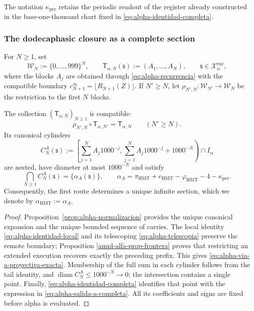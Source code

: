 The notation \(\kappa_{\mathrm{per}}\) retains the periodic readout of the register already constructed in the base-one-thousand chart fixed in \eqref{eq:alpha-identidad-completa}.

\subsubsection{The dodecaphasic closure as a complete section}

For \(N\geq1\), set
\[
 \mathcal W_N:=\{0,\ldots,999\}^{N},
 \qquad
 \mathsf T_{\alpha,N}(\mathsf s):=(A_1,\ldots,A_N),
 \qquad \mathsf s\in\mathcal X_{\alpha}^{\mathrm{enr}},
\]
where the blocks \(A_j\) are obtained through
\eqref{eq:alpha-recurrencia} with the compatible boundary
\(c_{N+1}^{\infty}=\lfloor R_{N+1}(Z)\rfloor\). If \(N'\geq N\), let
\(\rho_{N',N}:\mathcal W_{N'}\to\mathcal W_N\) be the restriction to the
first \(N\) blocks.

\begin{theorem}
\label{thm:alpha-salida-dodecafasica-completa}
The collection \((\mathsf T_{\alpha,N})_{N\geq1}\) is compatible:
\begin{equation}
 \rho_{N',N}\circ\mathsf T_{\alpha,N'}
 =\mathsf T_{\alpha,N}
 \qquad(N'\geq N).
 \label{eq:alpha-via-a-proyectiva-exacta}
\end{equation}
Its canonical cylinders
\begin{equation}
 C_N^A(\mathsf s):=
 \left[
  \sum_{j=1}^{N}A_j1000^{-j},
  \sum_{j=1}^{N}A_j1000^{-j}+1000^{-N}
 \right)\cap I_\alpha
 \label{eq:alpha-cilindros-via-a-exactos}
\end{equation}
are nested, have diameter at most \(1000^{-N}\) and satisfy
\begin{equation}
 \bigcap_{N\geq1}C_N^A(\mathsf s)
 =\{\alpha_A(\mathsf s)\},
 \qquad
 \alpha_A
 =\pi_{\mathrm{HMT}}+e_{\mathrm{HMT}}-\varphi_{\mathrm{HMT}}
  -4-\kappa_{\mathrm{per}}.
 \label{eq:alpha-salida-a-completa}
\end{equation}
Consequently, the first route determines a unique infinite section, which we
denote by \(\alpha_{\mathrm{HMT}}:=\alpha_A\).
\end{theorem}

\begin{proof}
Proposition~\ref{prop:alpha-normalizacion} provides the unique canonical
expansion and the unique bounded sequence of carries. The local identity
\eqref{eq:alpha-identidad-local} and its telescoping
\eqref{eq:alpha-telescopia} preserve the remote boundary; Proposition
\ref{ampl-alfa-prop-frontera} proves that restricting an extended execution
recovers exactly the preceding prefix. This gives
\eqref{eq:alpha-via-a-proyectiva-exacta}. Membership of the full sum
in each cylinder follows from the tail identity, and
\(\operatorname{diam}C_N^A\leq1000^{-N}\to0\); the intersection contains a
single point. Finally, \eqref{eq:alpha-identidad-completa} identifies that
point with the expression in \eqref{eq:alpha-salida-a-completa}. All its
coefficients and signs are fixed before alpha is evaluated.
\end{proof}

